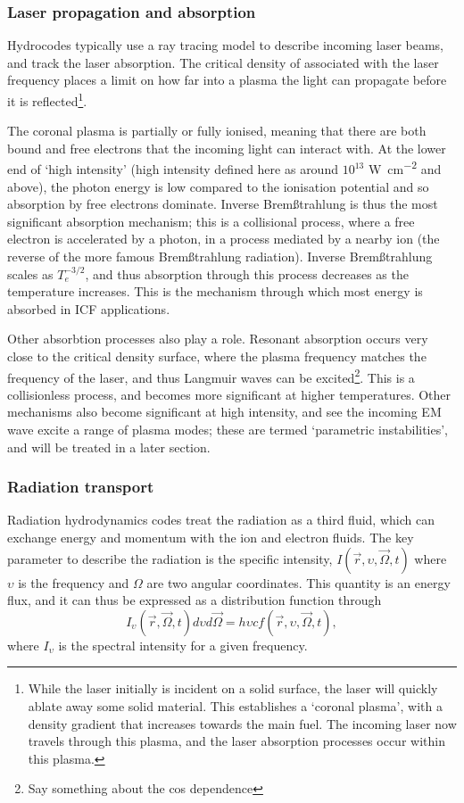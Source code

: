 \subsubsection{Laser propagation and absorption}
Hydrocodes typically use a ray tracing model to describe incoming laser beams, and track the laser absorption. The critical density of associated with the laser frequency places a limit on how far into a plasma the light can propagate before it is reflected\footnote{While the laser initially is incident on a solid surface, the laser will quickly ablate away some solid material. This establishes a `coronal plasma', with a density gradient that increases towards the main fuel. The incoming laser now travels through this plasma, and the laser absorption processes occur within this plasma.}.

The coronal plasma is partially or fully ionised, meaning that there are both bound and free electrons that the incoming light can interact with. At the lower end of `high intensity' (high intensity defined here as around $10^{13}$ \unit{\watt\per\centi\meter\squared} and above), the photon energy is low compared to the ionisation potential and so absorption by free electrons dominate. Inverse Brem{\ss}trahlung is thus the most significant absorption mechanism; this is a collisional process, where a free electron is accelerated by a photon, in a process mediated by a nearby ion (the reverse of the more famous Brem{\ss}trahlung radiation). Inverse Brem{\ss}trahlung scales as $T_e^{-3/2}$, and thus absorption through this process decreases as the temperature increases. This is the mechanism through which most energy is absorbed in ICF applications.

Other absorbtion processes also play a role. Resonant absorption occurs very close to the critical density surface, where the plasma frequency matches the frequency of the laser, and thus Langmuir waves can be excited\footnote{Say something about the cos dependence}. This is a collisionless process, and becomes more significant at higher temperatures. Other mechanisms also become significant at high intensity, and see the incoming EM wave excite a range of plasma modes; these are termed `parametric instabilities', and will be treated in a later section.

\subsubsection{Radiation transport}
Radiation hydrodynamics codes treat the radiation as a third fluid, which can exchange energy and momentum with the ion and electron fluids. The key parameter to describe the radiation is the specific intensity, $I(\vec{r}, \upsilon, \vec{\Omega}, t)$ where $\upsilon$ is the frequency and $\Omega$ are two angular coordinates. This quantity is an energy flux, and it can thus be expressed as a distribution function through 
\begin{equation} I_{\upsilon}(\vec{r}, \vec{\Omega}, t) d\upsilon d\vec{\Omega} = h \upsilon c f(\vec{r}, \upsilon, \vec{\Omega}, t), \end{equation}
where $I_{\upsilon}$ is the spectral intensity for a given frequency.

